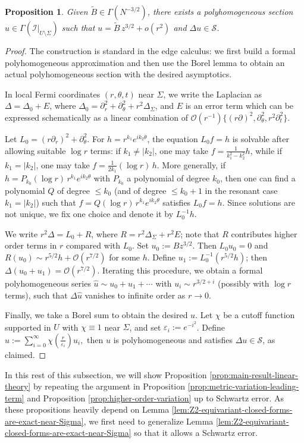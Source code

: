 \documentclass[11pt]{amsart}
\newtheorem{proposition}[theorem]{Proposition}
\begin{document}
\begin{proposition}
	\label{prop_existence_schwartz_approximation}
	Given \(\widetilde B\in \Gamma(N^{-3/2})\), there exists a polyhomogeneous section
	\(u\in \Gamma(\mathcal I|_{U\setminus\Sigma})\) such that \(u= \widetilde B\, z^{3/2}+ o(r^2)\) and
	\(\Delta u\in \mathcal S\).
\end{proposition}
\begin{proof}
	The construction is standard in the edge calculus: we first build a formal polyhomogeneous approximation and then use the Borel lemma to obtain an actual polyhomogeneous section with the desired asymptotics.
	
	In local Fermi coordinates \((r,\theta,t)\) near \(\Sigma\), we write the Laplacian as \(\Delta=\Delta_0+E\), where
	\(\Delta_0=\partial_r^2+\partial_\theta^2+r^2\Delta_\Sigma\), and \(E\) is an error term which can be expressed schematically as a linear combination of
	\(\mathcal O(r^{-1})\{(r\partial)^2,\partial_\theta^2,r^2\partial_t^2\}\).

	Let \(L_0=(r\partial_r)^2+\partial_\theta^2\).
	For \(h=r^{k_1}e^{ik_2\theta}\), the equation \(L_0 f=h\) is solvable after allowing suitable \(\log r\) terms:
	if \(k_1\neq |k_2|\), one may take \(f=\frac{1}{k_1^2-k_2^2}h\), while if \(k_1=|k_2|\), one may take \(f=\frac{1}{2k_1}(\log r)\,h\).
	More generally, if \(h=P_{k_0}(\log r)\,r^{k_1}e^{ik_2\theta}\) with \(P_{k_0}\) a polynomial of degree \(k_0\), then one can find a polynomial \(Q\) of degree \(\le k_0\) (and of degree \(\le k_0+1\) in the resonant case \(k_1=|k_2|\)) such that
	\(f=Q(\log r)\,r^{k_1}e^{ik_2\theta}\) satisfies \(L_0 f=h\).
	Since solutions are not unique, we fix one choice and denote it by \(L_0^{-1}h\).
	
	We write \(r^2\Delta=L_0+R\), where \(R=r^2\Delta_\Sigma+r^2E\); note that \(R\) contributes higher order terms in \(r\) compared with \(L_0\).
	Set \(u_0:=B z^{3/2}\).
	Then \(L_0u_0=0\) and \(R(u_0)\sim r^{5/2}h+\mathcal O(r^{7/2})\) for some \(h\).
	Define \(u_1:=L_0^{-1}(r^{5/2}h)\); then \(\Delta(u_0+u_1)=\mathcal O(r^{7/2})\).
	Iterating this procedure, we obtain a formal polyhomogeneous series \(\hat u\sim u_0+u_1+\cdots\) with
	\(u_i\sim r^{3/2+i}\) (possibly with \(\log r\) terms), such that \(\Delta \hat u\) vanishes to infinite order as \(r\to 0\).
	
	Finally, we take a Borel sum to obtain the desired \(u\).
	Let \(\chi\) be a cutoff function supported in \(U\) with \(\chi\equiv 1\) near \(\Sigma\), and set \(\varepsilon_i:=e^{-i^2}\).
	Define $u:=\sum_{i=0}^{\infty}\chi\!\left(\frac{r}{\varepsilon_i}\right)u_i,$ then \(u\) is polyhomogeneous and satisfies \(\Delta u\in \mathcal S\), as claimed.
\end{proof}
In this rest of this subsection, we will show Proposition \ref{prop:main-result-linear-theory}  by repeating the argument in Proposition \ref{prop:metric-variation-leading-term} and Proposition \ref{prop:higher-order-variation} up to Schwartz error. As these propositions heavily depend on Lemma \ref{lem:Z2-equivariant-closed-forms-are-exact-near-Sigma}, we first need to generalize Lemma \ref{lem:Z2-equivariant-closed-forms-are-exact-near-Sigma} so that it allows a Schwartz error.
\end{document}
